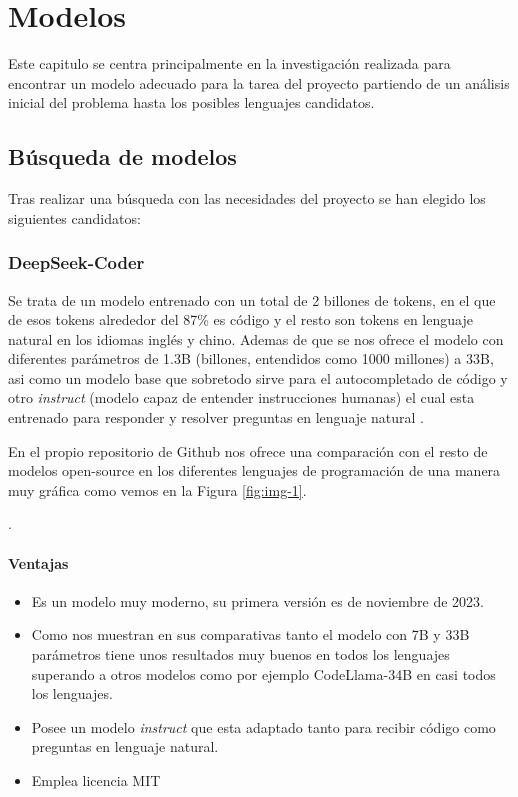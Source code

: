 \chapter{Modelos}

Este capitulo se centra principalmente en la investigación realizada para encontrar un modelo adecuado para la tarea del proyecto partiendo de un análisis inicial del problema hasta los posibles lenguajes candidatos. 

\section{Búsqueda de modelos}
\label{cap:modelos}
Tras realizar una búsqueda con las necesidades del proyecto se han elegido los siguientes candidatos:

\subsection{DeepSeek-Coder}
Se trata de un modelo entrenado con un total de 2 billones de tokens, en el que de esos tokens alrededor del 87\% es código y el resto son tokens en lenguaje natural en los idiomas inglés y chino. Ademas de que se nos ofrece el modelo con diferentes parámetros  de 1.3B (billones, entendidos como 1000 millones) a 33B, asi como un modelo base que sobretodo sirve para el autocompletado de código y otro \textit{instruct} (modelo capaz de entender instrucciones humanas) el cual esta entrenado para responder y resolver preguntas en lenguaje natural \cite{DeepSeek-coder}.

En el propio repositorio de Github nos ofrece una comparación con el resto de modelos open-source en los diferentes lenguajes de programación de una manera muy gráfica como vemos en la Figura \ref{fig:img-1}.

.

\subsubsection{Ventajas}
\begin{itemize}
	\item Es un modelo muy moderno, su primera versión es de noviembre de 2023.
	\item Como nos muestran en sus comparativas tanto el modelo con 7B y 33B parámetros tiene unos resultados muy buenos en todos los lenguajes superando a otros modelos como por ejemplo CodeLlama-34B en casi todos los lenguajes.
    \item Posee un modelo \textit{instruct} que esta adaptado tanto para recibir código como preguntas en lenguaje natural.
    \item Emplea licencia MIT
\end{itemize}
